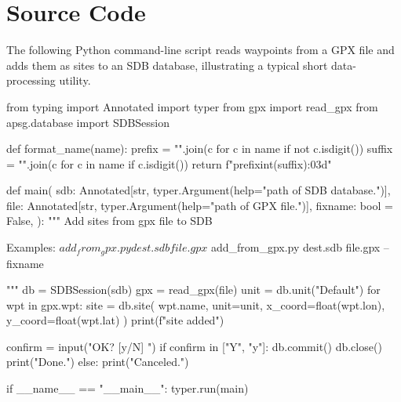 \chapter{Source Code}\label{app:code}

The following Python command-line script reads waypoints from a GPX file and adds them as sites to an SDB database, illustrating a typical short data-processing utility.

\begin{code}[Python]
from typing import Annotated
import typer
from gpx import read_gpx
from apsg.database import SDBSession


def format_name(name):
    prefix = "".join(c for c in name if not c.isdigit())
    suffix = "".join(c for c in name if c.isdigit())
    return f"{prefix}{int(suffix):03d}"


def main(
    sdb: Annotated[str, typer.Argument(help="path of SDB database.")],
    file: Annotated[str, typer.Argument(help="path of GPX file.")],
    fixname: bool = False,
):
    """
    Add sites from gpx file to SDB

    Examples:
        $ add_from_gpx.py dest.sdb file.gpx
        $ add_from_gpx.py dest.sdb file.gpx --fixname

    """
    db = SDBSession(sdb)
    gpx = read_gpx(file)
    unit = db.unit("Default")
    for wpt in gpx.wpt:
        site = db.site(
            wpt.name,
            unit=unit, x_coord=float(wpt.lon), y_coord=float(wpt.lat)
        )
        print(f"{site} added")

    confirm = input("OK? [y/N] ")
    if confirm in ["Y", "y"]:
        db.commit()
        db.close()
        print("Done.")
    else:
        print("Canceled.")


if __name__ == "__main__":
    typer.run(main)
\end{code}

